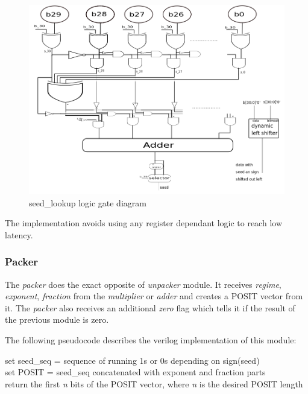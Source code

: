 \documentclass[10pt]{article}
\begin{document}
\begin{figure}[h]
  \centering
  \includegraphics[width=.8\textwidth,height=0.3\paperheight]{seed_lookup}
  \caption{seed\_lookup logic gate diagram}
  \label{fig:seed_lookup_diagram}
\end{figure}

The implementation avoids using any register dependant logic to reach low
latency.

\subsubsection{Packer}\label{sec:packer}

The \textit{packer} does the exact opposite of \textit{unpacker} module. It
receives \textit{regime}, \textit{exponent}, \textit{fraction} from the
\textit{multiplier} or \textit{adder} and creates a POSIT vector from it.
The \textit{packer} also receives an additional \textit{zero} flag which tells
it if the result of the previous module is zero.

The following pseudocode describes the verilog implementation of this module:\\

\begin{algorithm}[H]
  {
   set seed\_seq = sequence of running 1s or 0s depending on sign(seed) \\
   set POSIT = seed\_seq concatenated with exponent and fraction parts \\
   return the first \textit{n} bits of the POSIT vector, where \textit{n} is the
   desired POSIT length
 }
\end{algorithm}
\end{document}
